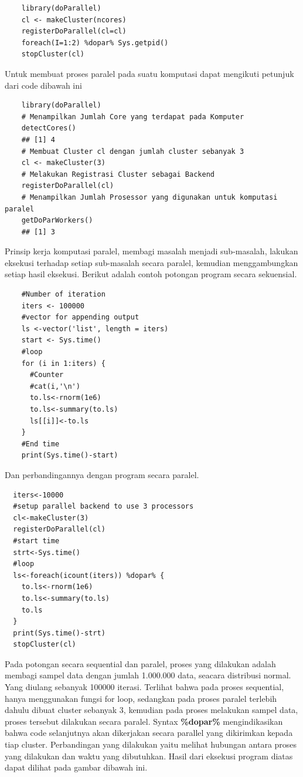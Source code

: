 \begin{lstlisting}
	library(doParallel)​
	cl <- makeCluster(ncores)​
	registerDoParallel(cl=cl)​
	foreach(I=1:2) %dopar% Sys.getpid()​
	stopCluster(cl)​
\end{lstlisting}

Untuk membuat proses paralel pada suatu komputasi dapat mengikuti petunjuk dari code dibawah ini

\begin{lstlisting}
	library(doParallel)
	# Menampilkan Jumlah Core yang terdapat pada Komputer
	detectCores()
	## [1] 4
	# Membuat Cluster cl dengan jumlah cluster sebanyak 3
	cl <- makeCluster(3)
	# Melakukan Registrasi Cluster sebagai Backend
	registerDoParallel(cl)
	# Menampilkan Jumlah Prosessor yang digunakan untuk komputasi paralel
	getDoParWorkers()
	## [1] 3
\end{lstlisting}

Prinsip kerja komputasi paralel, membagi masalah menjadi sub-masalah, lakukan eksekusi terhadap setiap sub-masalah secara paralel, kemudian menggambungkan setiap hasil eksekusi. Berikut adalah contoh potongan program secara sekuensial.

\begin{lstlisting}
	#Number of iteration
	iters <- 100000
	#vector for appending output
	ls <-vector('list', length = iters)
	start <- Sys.time()
	#loop
	for (i in 1:iters) {
	  #Counter
	  #cat(i,'\n')
	  to.ls<-rnorm(1e6)
	  to.ls<-summary(to.ls)
	  ls[[i]]<-to.ls
	}
	#End time
	print(Sys.time()-start)
\end{lstlisting}

Dan perbandingannya dengan program secara paralel.

\begin{lstlisting}
  iters<-10000
  #setup parallel backend to use 3 processors
  cl<-makeCluster(3)
  registerDoParallel(cl)
  #start time
  strt<-Sys.time()
  #loop
  ls<-foreach(icount(iters)) %dopar% {
    to.ls<-rnorm(1e6)
    to.ls<-summary(to.ls)
    to.ls
  }
  print(Sys.time()-strt)
  stopCluster(cl)
\end{lstlisting}

Pada potongan secara sequential dan paralel, proses yang dilakukan adalah membagi sampel data dengan jumlah 1.000.000 data, seacara distribusi normal. Yang diulang sebanyak 100000 iterasi.  Terlihat bahwa pada proses sequential, hanya menggunakan fungsi for loop, sedangkan pada proses paralel terlebih dahulu dibuat cluster sebanyak 3, kemudian pada proses melakukan sampel data, proses tersebut dilakukan secara paralel. Syntax \textbf{\%dopar\%} mengindikasikan bahwa code selanjutnya akan dikerjakan secara parallel yang dikirimkan kepada tiap cluster.  Perbandingan yang dilakukan yaitu melihat hubungan antara proses yang dilakukan dan waktu yang dibutuhkan. Hasil dari eksekusi program diatas dapat dilihat pada gambar dibawah ini.

